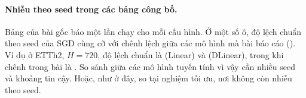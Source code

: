 \paragraph{Nhiễu theo seed trong các bảng công bố.} Bảng của bài gốc báo một lần chạy cho mỗi cấu hình. Ở một số ô, độ lệch chuẩn theo seed của SGD cùng cỡ với chênh lệch giữa các mô hình mà bài báo cáo (). Ví dụ ở ETTh2, $H = 720$, độ lệch chuẩn là \nmBOneETThTwoHSevenTwoZeroLinearSd{} (Linear) và \nmBOneETThTwoHSevenTwoZeroDLinearSd{} (DLinear), trong khi chênh trong bài là \nmCThreeETThTwoHSevenTwoZeroPubD. So sánh giữa các mô hình tuyến tính vì vậy cần nhiều seed và khoảng tin cậy. Hoặc, như ở đây, so tại nghiệm tối ưu, nơi không còn nhiễu theo seed.
